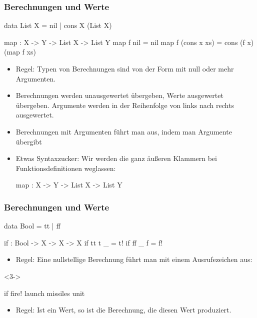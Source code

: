 \documentclass{beamer}
\begin{document}
\begin{frame}[fragile]
  \frametitle{Berechnungen und Werte}

\begin{frankcode}
data List X = nil | cons X (List X)

map : {{X -> Y} -> List X -> List Y}
map f nil         = nil
map f (cons x xs) = cons (f x) (map f xs)
\end{frankcode}

\begin{itemize}
  \item<2-> Regel: Typen von Berechnungen sind von der Form  mit null oder mehr Argumenten.
  \item<3-> Berechnungen werden unausgewertet übergeben, Werte ausgewertet übergeben. Argumente werden in der Reihenfolge von links nach rechts ausgewertet.
  \item<4-> Berechnungen mit Argumenten führt man aus, indem man Argumente übergibt
  \item<5-> 
    Etwas Syntaxzucker: Wir werden die ganz äußeren Klammern bei Funktionsdefinitionen weglassen:

    \begin{frankcode}
    map : {X -> Y} -> List X -> List Y
    \end{frankcode}
\end{itemize}
\end{frame}

\begin{frame}[fragile]
  \frametitle{Berechnungen und Werte}

\begin{frankcode}
data Bool = tt | ff

if : Bool -> {X} -> {X} -> X
if tt t _ = t!
if ff _ f = f!
\end{frankcode}

\begin{itemize}
  \item<2-> Regel: Eine nullstellige Berechnung  führt man mit einem Ausrufezeichen aus: 
\end{itemize}

\begin{visibleenv}<3->
\begin{frankcode}
if fire! {launch missiles} {unit}
\end{frankcode}
\end{visibleenv}

\begin{itemize}
  \item<4-> Regel: Ist  ein Wert, so ist  die Berechnung, die diesen Wert produziert.
\end{itemize}

\end{frame}
\end{document}

